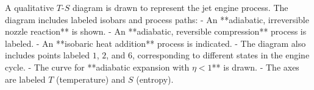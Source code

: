 A qualitative \( T \)-\( S \) diagram is drawn to represent the jet engine process. The diagram includes labeled isobars and process paths:  
- An **adiabatic, irreversible nozzle reaction** is shown.  
- An **adiabatic, reversible compression** process is labeled.  
- An **isobaric heat addition** process is indicated.  
- The diagram also includes points labeled \( 1 \), \( 2 \), and \( 6 \), corresponding to different states in the engine cycle.  
- The curve for **adiabatic expansion with \( \eta < 1 \)** is drawn.  
- The axes are labeled \( T \) (temperature) and \( S \) (entropy).